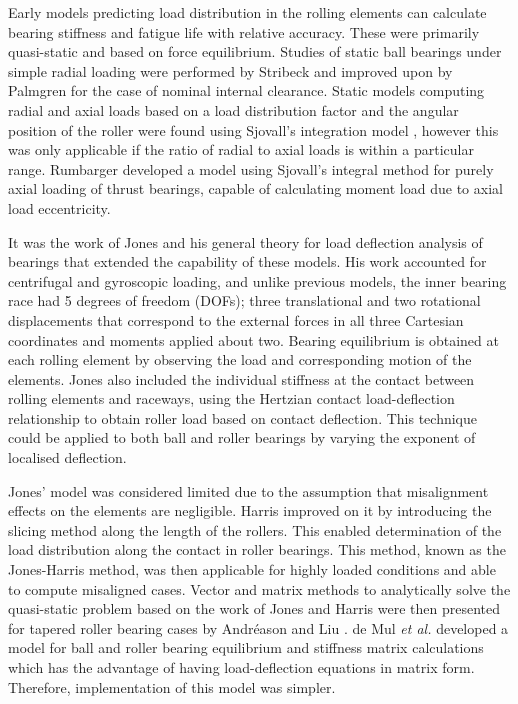 Early models predicting load distribution in the rolling elements can calculate bearing stiffness and fatigue life with relative accuracy. These were primarily quasi-static and based on force equilibrium. Studies of static ball bearings under simple radial loading were performed by Stribeck \cite{Stribeck1907} and improved upon by Palmgren \cite{Palmgren1959} for the case of nominal internal clearance. Static models computing radial and axial loads based on a load distribution factor and the angular position of the roller were found using Sjovall’s integration model \cite{Sjovall1933}, however this was only applicable if the ratio of radial to axial loads is within a particular range. Rumbarger \cite{JRumbarger1962} developed a model using Sjovall’s integral method for purely axial loading of thrust bearings, capable of calculating moment load due to axial load eccentricity. 

It was the work of Jones \cite{Jones1960} and his general theory for load deflection analysis of bearings that extended the capability of these models. His work accounted for centrifugal and gyroscopic loading, and unlike previous models, the inner bearing race had 5 degrees of freedom (DOFs); three translational and two rotational displacements that correspond to the external forces in all three Cartesian coordinates and moments applied about two. Bearing equilibrium is obtained at each rolling element by observing the load and corresponding motion of the elements. Jones also included the individual stiffness at the contact between rolling elements and raceways, using the Hertzian contact load-deflection relationship to obtain roller load based on contact deflection. This technique could be applied to both ball and roller bearings by varying the exponent of localised deflection. 

Jones' model was considered limited due to the assumption that misalignment effects on the elements are negligible. Harris \cite{Harris1984} improved on it by introducing the slicing method along the length of the rollers. This enabled determination of the load distribution along the contact in roller bearings. This method, known as the Jones-Harris method, was then applicable for highly loaded conditions and able to compute misaligned cases. Vector and matrix methods to analytically solve the quasi-static problem based on the work of Jones and Harris were then presented for tapered roller bearing cases by Andréason \cite{Andreason1973} and Liu \cite{Liu1976}. de Mul \textit{et al.} \cite{DeMul1989_2} developed a model for ball and roller bearing equilibrium and stiffness matrix calculations which has the advantage of having load-deflection equations in matrix form. Therefore, implementation of this model was simpler.


